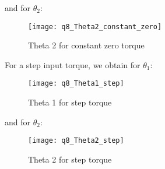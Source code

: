 	\newline and for $\theta _{2}$:\newline
	\begin{figure}[position = here]
		\begin{centering}
			\texttt{[image: q8\_Theta2\_constant\_zero]}\\
			\caption [WSpace]{Theta 2 for constant zero torque}
		\end{centering}
	\end{figure}
	\pagebreak
	\newline For a step input torque, we obtain for $\theta _{1}$:\newline
	\begin{figure}[position = here]
		\begin{centering}
			\texttt{[image: q8\_Theta1\_step]}\\
			\caption [WSpace]{Theta 1 for step torque}
		\end{centering}
	\end{figure}
	\newline and for $\theta _{2}$:\newline
	\begin{figure}[position = here]
		\begin{centering}
			\texttt{[image: q8\_Theta2\_step]}\\
			\caption [WSpace]{Theta 2 for step torque}
		\end{centering}
	\end{figure}

	

